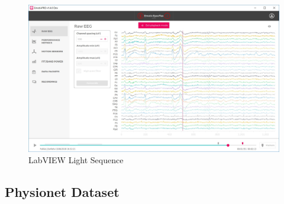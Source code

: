 \documentclass{article}
\begin{document}
\begin{figure}[tbp]
    \centering
    \includegraphics[scale=0.3]{Images/EmotivPRO-Markers.jpg}
    \caption{LabVIEW Light Sequence}
    \label{fig:LabVIEW Light Sequence}
\end{figure}


\subsection{Physionet Dataset}

\newpage


\end{document}
